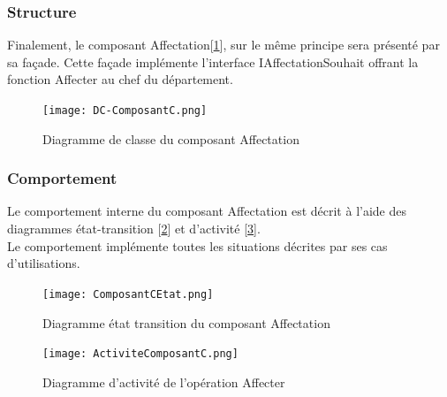 \documentclass[a4paper,11pt]{article}
\newcommand{\br}{\\\mbox{}}
\begin{document}
\subsubsection*{Structure}
Finalement, le composant Affectation[\ref{DCE__}], sur le même principe sera présenté par sa façade. Cette façade implémente l'interface IAffectationSouhait offrant la fonction Affecter au chef du département.
\begin{figure}
\centering
\texttt{[image: DC-ComposantC.png]}
\caption{Diagramme de classe du composant Affectation}
\label{DCE__}
\end{figure}

\subsubsection*{Comportement}
Le comportement interne du composant Affectation est décrit à l'aide des diagrammes état-transition [\ref{DCE}] et d'activité [\ref{DCE_}].\br
Le comportement implémente toutes les situations décrites par ses cas d'utilisations.
\begin{figure}
\centering
\texttt{[image: ComposantCEtat.png]}
\caption{Diagramme état transition du composant Affectation}
\label{DCE}
\end{figure}

\begin{figure}
\centering
\texttt{[image: ActiviteComposantC.png]}
\caption{Diagramme d'activité de l'opération Affecter}
\label{DCE_}
\end{figure}






\pagebreak 
\end{document}
